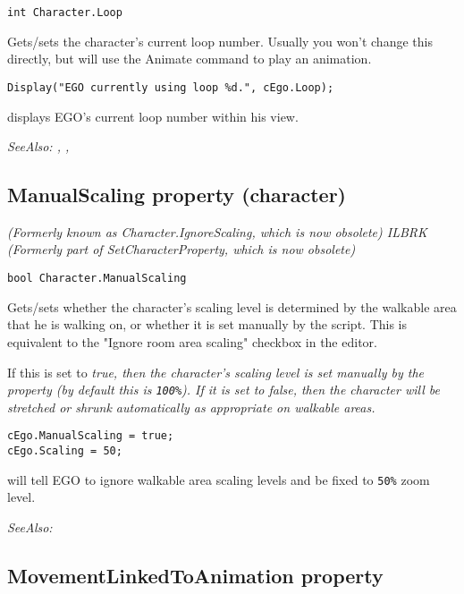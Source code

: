 \begin{verbatim}
int Character.Loop
\end{verbatim}
Gets/sets the character's current loop number. Usually you won't change this
directly, but will use the Animate command to play an animation.

\begin{verbatim}
Display("EGO currently using loop %d.", cEgo.Loop);
\end{verbatim}
displays EGO's current loop number within his view.

\it{SeeAlso:} ,
,


\subsection{ManualScaling property (character)}\label{Character.ManualScaling}%

\it{(Formerly known as Character.IgnoreScaling, which is now obsolete)} ILBRK
\it{(Formerly part of SetCharacterProperty, which is now obsolete)}

\begin{verbatim}
bool Character.ManualScaling
\end{verbatim}
Gets/sets whether the character's scaling level is determined by the walkable area that
he is walking on, or whether it is set manually by the script. This is equivalent
to the "Ignore room area scaling" checkbox in the editor.

If this is set to \it{true}, then the character's scaling level is set manually by the
 property (by default this is \verb$100%$).
If it is set to \it{false}, then the character will be stretched or shrunk
automatically as appropriate on walkable areas.

\begin{verbatim}
cEgo.ManualScaling = true;
cEgo.Scaling = 50;
\end{verbatim}
will tell EGO to ignore walkable area scaling levels and be fixed to \verb$50%$ zoom level.

\it{SeeAlso:} 


\subsection{MovementLinkedToAnimation property}\label{Character.MovementLinkedToAnimation}%

